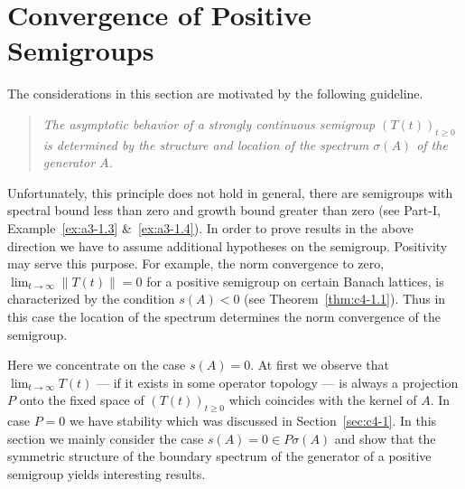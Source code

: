\section{Convergence of Positive Semigroups}\label{sec:c4-2}
%
\hspace{1cm}{\Large by Günther Greiner and Rainer Nagel}
\vspace{.5cm}
\newline
The considerations in this section are motivated by the following guideline.
\begin{quote} 
\textit{The asymptotic behavior of a strongly continuous semigroup $(T(t))_{t \geq 0}$ is determined by the structure and location of the spectrum $\sigma(A)$ of the generator $A$.}
\end{quote}
Unfortunately, this principle does not hold in general, \eg  there are semigroups with spectral bound less than zero and growth bound greater than zero (see Part-I, Example~\ref{ex:a3-1.3} \&~\ref{ex:a3-1.4}).
In order to prove results in the above direction we have to assume additional hypotheses on the semigroup.
Positivity may serve this purpose.
For example, the norm convergence to zero, \ie  $\lim_{t \to \infty} \|T(t)\| = 0$ for a positive semigroup on certain Banach lattices, is characterized by the condition $s(A) < 0$ (see Theorem~\ref{thm:c4-1.1}).
Thus in this case the location of the spectrum determines the norm convergence of the semigroup.

Here we concentrate on the case $s(A) = 0$.
At first we observe that
$\lim_{t \to \infty} T(t)$ --- if it exists in some operator topology --- is always a projection $P$ onto the fixed space of\/ $(T(t))_{t \geq 0}$ which coincides with the kernel of\/ $A$.
In case $P = 0$ we have stability which was discussed in Section~\ref{sec:c4-1}.
In this section we mainly consider the case $s(A) = 0 \in P{\sigma}(A)$ and show that the symmetric structure of the boundary spectrum of the generator of a positive semigroup yields interesting results.


